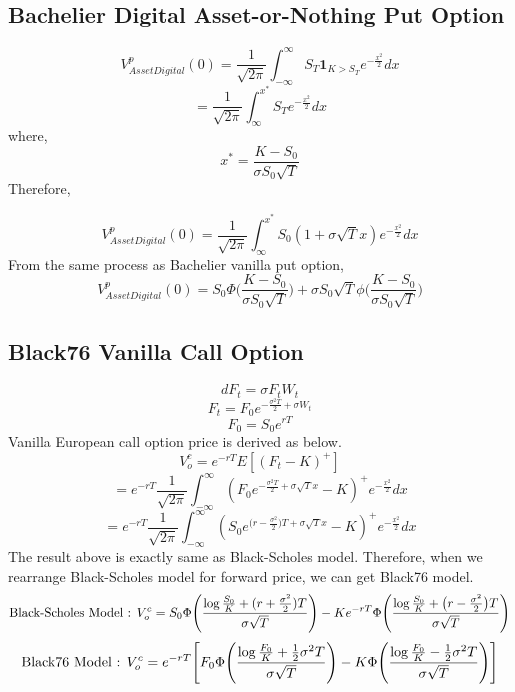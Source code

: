 \documentclass{article}
\begin{document}
\subsection{Bachelier Digital Asset-or-Nothing Put Option}
$$
V^{p}_{Asset Digital}(0) = \frac{1}{\sqrt{2\pi}}\int_{-\infty}^{\infty}S_T\mathbf{1}_{K>S_T}e^{-\frac{x^{2}}{2}}dx
$$
$$
= \frac{1}{\sqrt{2\pi}}\int_{\infty}^{x^{*}}S_Te^{-\frac{x^{2}}{2}}dx
$$
where,
$$
x^{*} = \frac{K-S_0}{\sigma S_0\sqrt{T}} 
$$
Therefore,

$$
V^{p}_{Asset Digital}(0) = \frac{1}{\sqrt{2\pi}}\int_{\infty}^{x^{*}} S_0(1 + \sigma \sqrt{T}x)e^{-\frac{x^{2}}{2}}dx
$$
From the same process as Bachelier vanilla put option,
$$
V^{p}_{Asset Digital}(0) = S_0\Phi\bigg(\frac{K-S_0}{\sigma S_0\sqrt{T}}\bigg) + \sigma S_0\sqrt{T}\phi\bigg(\frac{K-S_0}{\sigma S_0\sqrt{T}}\bigg)
$$

\subsection{Black76 Vanilla Call Option}

$$
dF_t = \sigma F_tW_t
$$$$
F_t = F_0e^{-\frac{\sigma^{2}T}{2} + \sigma W_t}
$$$$
F_0 = S_0e^{rT}
$$
Vanilla European call option price is derived as below.
$$
V_o^{c} = e^{-rT}{E}[(F_t-K)^{+}]
$$$$
= e^{-rT}\frac{1}{\sqrt{2\pi}}\int_{-\infty}^{\infty}(F_0e^{-\frac{\sigma^{2}T}{2} +\sigma\sqrt{T}x}-K)^{+}e^{-\frac{x^{2}}{2}}dx
$$
$$
= e^{-rT}\frac{1}{\sqrt{2\pi}}\int_{-\infty}^{\infty}(S_0e^{\big(r-\frac{\sigma^{2}}{2}\big)T +\sigma\sqrt{T}x}-K)^{+}e^{-\frac{x^{2}}{2}}dx
$$
The result above is exactly same as Black-Scholes model.
Therefore, when we rearrange Black-Scholes model for forward price, we can get Black76 model.
$$
\textnormal{Black-Scholes Model : }
V_o^{c} = S_0\Phi\Bigg(\frac{\log{\frac{S_0}{K}}+(r+\frac{\sigma^{2}}{2})T}{\sigma\sqrt{T}}\Bigg) - Ke^{-rT}\Phi\Bigg(\frac{\log{\frac{S_0}{K}}+\big(r-\frac{\sigma^{2}}{2}\big)T}{\sigma\sqrt{T}}\Bigg)
$$
$$
\textnormal{Black76 Model : }
V_o^{c} = e^{-rT}\Bigg[ F_0\Phi\Bigg(\frac{\log{\frac{F_0}{K}}+\frac{1}{2}\sigma^{2}T}{\sigma\sqrt{T}}\Bigg) - K\Phi\Bigg(\frac{\log{\frac{F_0}{K}}-\frac{1}{2}\sigma^{2}T}{\sigma\sqrt{T}}\Bigg)\Bigg]
$$
\end{document}
